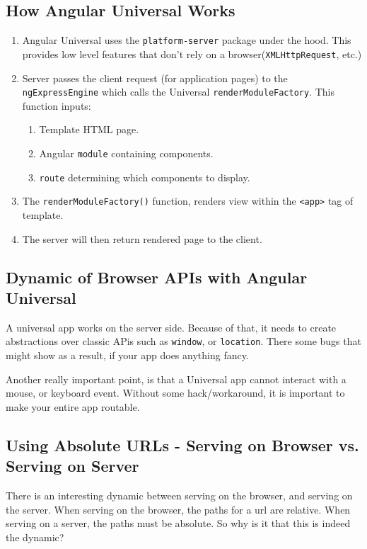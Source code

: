 \subsection{How Angular Universal Works}
\begin{enumerate}
  \item Angular Universal uses the \lstinline{platform-server} package under the hood. This provides low level features that don't rely on a browser(\lstinline{XMLHttpRequest}, etc.)
  \item Server passes the client request (for application pages) to the \lstinline{ngExpressEngine} which calls the Universal \lstinline{renderModuleFactory}. This function inputs: 
  \begin{enumerate}
    \item Template HTML page.
    \item Angular \lstinline{module} containing components.
    \item \lstinline{route} determining which components to display. 
  \end{enumerate}
  \item The \lstinline{renderModuleFactory()} function, renders view within the \lstinline{<app>} tag of template. 
  \item The server will then return rendered page to the client. 
\end{enumerate}

\subsection{Dynamic of Browser APIs with Angular Universal}
A universal app works on the server side. Because of that, it needs to create abstractions over classic APis such as \lstinline{window}, or \lstinline{location}. There some bugs that might show as a result, if your app does anything fancy. 

Another really important point, is that a Universal app cannot interact with a mouse, or keyboard event. Without some hack/workaround, it is important to make your entire app routable. 

\subsection{Using Absolute URLs - Serving on Browser vs. Serving on Server }
There is an interesting dynamic between serving on the browser, and serving on the server. When serving on the browser, the paths for a url are relative. When serving on a server, the paths must be absolute. So why is it that this is indeed the dynamic? 

